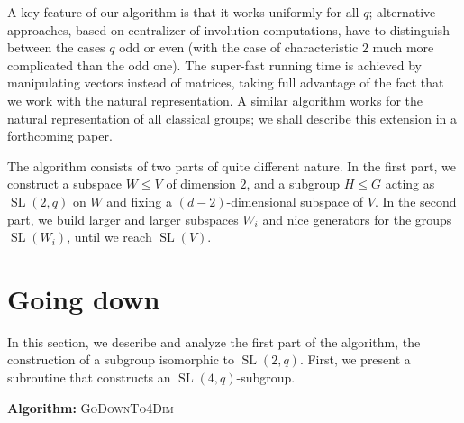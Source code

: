 \documentclass[a4paper,11pt]{article}
\def\SL{\operatorname{SL}}
\renewcommand{\bf}{\textbf} \renewcommand{\L}{\Lambda}
\begin{document}
A key feature of our algorithm is that it works uniformly for all $q$;
alternative approaches, based on centralizer of involution computations,
have to distinguish between the cases $q$ odd or even (with the case
of characteristic $2$ much more complicated than the odd one). The
super-fast running time is achieved by manipulating vectors instead
of matrices, taking full advantage of the fact that we work with the
natural representation. A similar algorithm works for the natural
representation of all classical groups; we shall describe this extension
in a forthcoming paper.

The algorithm consists of two parts of quite different nature. In
the first part, we construct a subspace $W \le V$ of dimension $2$,
and a subgroup $H \le G$ acting as $\SL(2,q)$ on $W$ and fixing a
$(d-2)$-dimensional subspace of $V$. In the second part, we build
larger and larger subspaces $W_i$ and nice generators for the groups
$\SL(W_i)$, until we reach $\SL(V)$.

\section{Going down}
\label{going down}

In this section, we describe and analyze the first part of the
algorithm, the construction of a subgroup isomorphic to $\SL(2,q)$.
First, we present a subroutine that constructs an $\SL(4,q)$-subgroup.

\medskip\noindent
{\bf {Algorithm:}} \textsc{GoDownTo4Dim}
\end{document}
